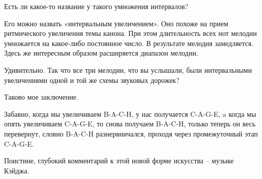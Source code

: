 \documentclass[../main.tex]{subfiles}
\begin{document}
\begin{dialogue}
 Есть ли какое-то название у такого умножения интервалов?

 Его можно назвать «интервальным увеличением». Оно похоже на прием ритмического увеличения темы канона. При этом длительность всех нот мелодии умножается на какое-либо постоянное число. В результате мелодия замедляется. Здесь же интересным образом расширяется диапазон мелодии.

 Удивительно. Так что все три мелодии, что вы услышали, были интервальными увеличениями одной и той же схемы звуковых дорожек?

 Таково мое заключение.

 Забавно, когда мы увеличиваем \mbox{B-A-C-H}, у нас получается \mbox{C-A-G-E}, a когда мы опять увеличиваем \mbox{C-A-G-E}, то снова получаем \mbox{B-A-C-H}, только теперь он весь перевернут, словно \mbox{B-A-C-H} разнервничался, проходя через промежуточный этап \mbox{C-A-G-E}.

 Поистине, глубокий комментарий к этой новой форме искусства \--- музыке Кэйджа.

\end{dialogue}
\end{document}
